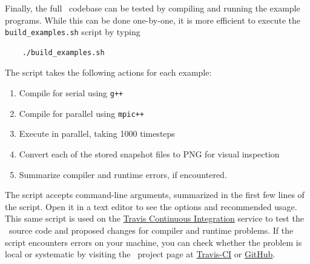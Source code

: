 Finally, the full \MMSP\ codebase can be tested by compiling and running the example programs.  While this can be done one-by-one, it is more efficient to execute the {\tt build\_examples.sh} script by typing
\begin{shadebox}
\begin{verbatim}
    ./build_examples.sh
\end{verbatim}
\end{shadebox}
The script takes the following actions for each example:
\begin{enumerate}
  \item Compile for serial using {\tt g++}
  \item Compile for parallel using {\tt mpic++}
  \item Execute in parallel, taking 1000 timesteps
  \item Convert each of the stored snapshot files to PNG for visual inspection
  \item Summarize compiler and runtime errors, if encountered.
\end{enumerate}
The script accepts command-line arguments, summarized in the first few lines of the script.  Open it in a text editor to see the options and recommended usage.  This same script is used on the \href{http://travis-ci.org}{Travis Continuous Integration} service to test the \MMSP\ source code and proposed changes for compiler and runtime problems.  If the script encounters errors on your machine, you can check whether the problem is local or systematic by visiting the \MMSP\ project page at \href{https://travis-ci.org/mesoscale/mmsp}{Travis-CI} or \href{https://github.com/mesoscale/mmsp}{GitHub}.

